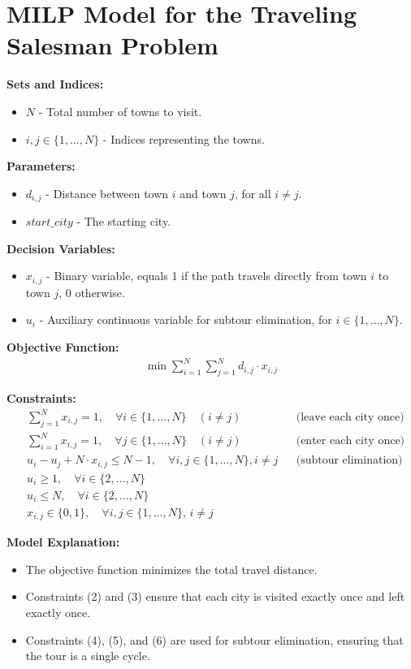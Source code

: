 \documentclass{article}
\begin{document}
\section*{MILP Model for the Traveling Salesman Problem}

\textbf{Sets and Indices:}
\begin{itemize}
    \item $N$ - Total number of towns to visit.
    \item $i, j \in \{1, \ldots, N\}$ - Indices representing the towns.
\end{itemize}

\textbf{Parameters:}
\begin{itemize}
    \item $d_{i,j}$ - Distance between town $i$ and town $j$, for all $i \neq j$.
    \item $start\_city$ - The starting city.
\end{itemize}

\textbf{Decision Variables:}
\begin{itemize}
    \item $x_{i,j}$ - Binary variable, equals 1 if the path travels directly from town $i$ to town $j$, 0 otherwise.
    \item $u_i$ - Auxiliary continuous variable for subtour elimination, for $i \in \{1, \ldots, N\}$.
\end{itemize}

\textbf{Objective Function:}
\begin{equation}
\begin{aligned}
    \min \sum_{i=1}^{N} \sum_{j=1}^{N} d_{i,j} \cdot x_{i,j}
\end{aligned}
\end{equation}

\textbf{Constraints:}
\begin{align}
    & \sum_{j=1}^{N} x_{i,j} = 1, \quad \forall i \in \{1, \ldots, N\} \quad (i \neq j) && \text{(leave each city once)} \\
    & \sum_{i=1}^{N} x_{i,j} = 1, \quad \forall j \in \{1, \ldots, N\} \quad (i \neq j) && \text{(enter each city once)} \\
    & u_i - u_j + N \cdot x_{i,j} \leq N - 1, \quad \forall i, j \in \{1, \ldots, N\}, i \neq j && \text{(subtour elimination)} \\
    & u_i \geq 1, \quad \forall i \in \{2, \ldots, N\} \\
    & u_i \leq N, \quad \forall i \in \{2, \ldots, N\} \\
    & x_{i,j} \in \{0, 1\}, \quad \forall i, j \in \{1, \ldots, N\}, \, i \neq j
\end{align}

\textbf{Model Explanation:}
\begin{itemize}
    \item The objective function minimizes the total travel distance.
    \item Constraints (2) and (3) ensure that each city is visited exactly once and left exactly once.
    \item Constraints (4), (5), and (6) are used for subtour elimination, ensuring that the tour is a single cycle.
\end{itemize}
\end{document}
